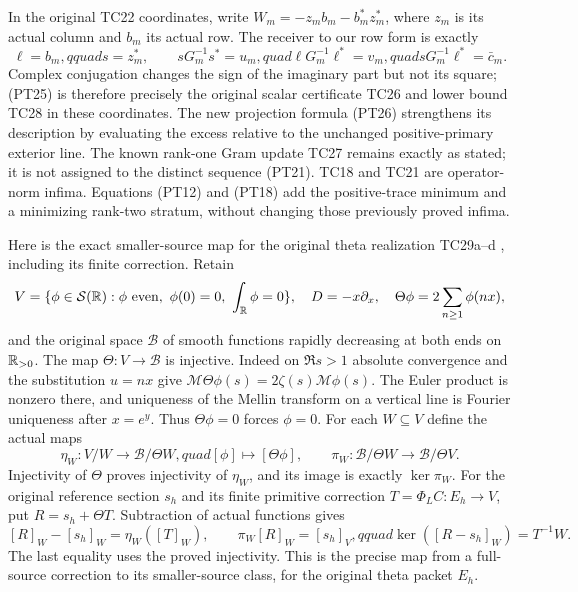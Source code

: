 In the original TC22 coordinates, write
\(W_m=-z_mb_m-b_m^*z_m^*\), where \(z_m\) is its actual
column and \(b_m\) its actual row. The receiver to our row form
is exactly
\begin{equation}\tag{PT32}
 \ell=b_m,qquad s=z_m^*,\qquad
 sG_m^{-1}s^*=u_m,quad \ell G_m^{-1}\ell^*=v_m,quad
 sG_m^{-1}\ell^*=\bar c_m.
\end{equation}
Complex conjugation changes the sign of the imaginary part but
not its square; (PT25) is therefore precisely the original scalar
certificate TC26 and lower bound TC28 in these coordinates. The
new projection formula (PT26) strengthens its description by
evaluating the excess relative to the unchanged positive-primary
exterior line. The known rank-one Gram update TC27 remains exactly
as stated; it is not assigned to the distinct sequence (PT21).
TC18 and TC21 are operator-norm infima. Equations (PT12) and
(PT18) add the positive-trace minimum and a minimizing rank-two
stratum, without changing those previously proved infima.

Here is the exact smaller-source map for the original theta
realization TC29a--d \cite{a03pt:tc}, including its finite correction.
Retain
\[
 V=\{\phi\in\mathcal S(\mathbb R):\phi\text{ even},\ \phi(0)=0,
                 \ \int_\mathbb R\phi=0\},\quad D=-x\partial_x,
 \quad\Theta\phi=2\sum_{n\ge1}\phi(nx),
\]
and the original space \(\mathscr B\) of smooth functions rapidly
decreasing at both ends on \(\mathbb R_{>0}\). The map \(\Theta:V\to
\mathscr B\) is injective. Indeed on \(\Re s>1\) absolute
convergence and the substitution \(u=nx\) give
\(\mathcal M\Theta\phi(s)=2\zeta(s)\mathcal M\phi(s)\).
The Euler product is nonzero there, and uniqueness of the Mellin
transform on a vertical line is Fourier uniqueness after \(x=e^y\).
Thus \(\Theta\phi=0\) forces \(\phi=0\).
For each \(W\subseteq V\) define the actual maps
\[
 \eta_W:V/W\longrightarrow\mathscr B/\Theta W,quad
 [\phi]\longmapsto[\Theta\phi],\qquad
 \pi_W:\mathscr B/\Theta W\longrightarrow\mathscr B/\Theta V.
\]
Injectivity of \(\Theta\) proves injectivity of \(\eta_W\),
and its image is exactly \(\ker\pi_W\). For the original
reference section \(s_h\) and its finite primitive correction
\(T=\Phi_LC:E_h\to V\), put \(R=s_h+\Theta T\). Subtraction
of actual functions gives
\begin{equation}\tag{PT33}
 [R]_W-[s_h]_W=\eta_W([T]_W),\qquad
 \pi_W[R]_W=[s_h]_V,qquad
 \ker([R-s_h]_W)=T^{-1}W.
\end{equation}
The last equality uses the proved injectivity. This is the
precise map from a full-source correction to its smaller-source
class, for the original theta packet \(E_h\).

